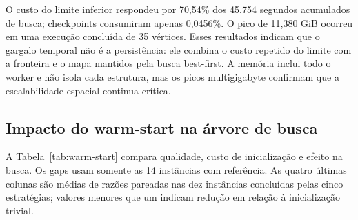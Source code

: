\documentclass[12pt]{article}
\begin{document}
O custo do limite inferior respondeu por 70,54\% dos 45.754 segundos acumulados
de busca; checkpoints consumiram apenas 0,0456\%. O pico de 11,380 GiB ocorreu
em uma execução concluída de 35 vértices. Esses resultados indicam que o
gargalo temporal não é a persistência: ele combina o custo repetido do limite
com a fronteira e o mapa mantidos pela busca best-first. A memória inclui todo o
worker e não isola cada estrutura, mas os picos multigigabyte confirmam que a
escalabilidade espacial continua crítica.

\subsection{Impacto do warm-start na árvore de busca}

A Tabela~\ref{tab:warm-start} compara qualidade, custo de inicialização e
efeito na busca. Os gaps usam somente as 14 instâncias com referência. As quatro
últimas colunas são médias de razões pareadas nas dez instâncias concluídas
pelas cinco estratégias;
valores menores que um indicam redução em relação à inicialização trivial.

\begin{table}[H]
  \centering
  \caption{Comparação das cinco estratégias de inicialização.}
  \label{tab:warm-start}
  \scriptsize
\end{table}
\end{document}
